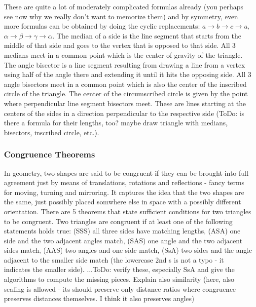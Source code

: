 These are quite a lot of moderately complicated formulas already (you perhaps see now why we really don't want to memorize them) and by symmetry, even more formulas can be obtained by doing the cyclic replacements: $a \rightarrow b \rightarrow c \rightarrow a$, $\alpha \rightarrow \beta \rightarrow \gamma \rightarrow \alpha$. The median of a side is the line segment that starts from the middle of that side and goes to the vertex that is opposed to that side. All 3 medians meet in a common point which is the center of gravity of the triangle. The angle bisector is a line segment resulting from drawing a line from a vertex using half of the angle there and extending it until it hits the opposing side. All 3 angle bisectors meet in a common point which is also the center of the inscribed circle of the triangle. The center of the circumscribed circle is given by the point where perpendicular line segment bisectors meet. These are lines starting at the centers of the sides in a direction perpendicular to the respective side (ToDo: is there a formula for their lengths, too? maybe draw triangle with medians, bisectors, inscribed circle, etc.).


\subsubsection{Congruence Theorems}
In geometry, two shapes are said to be congruent if they can be brought into full agreement just by means of translations, rotations and reflections - fancy terms for moving, turning and mirroring. It captures the idea that the two shapes are the same, just possibly placed somwhere else in space with a possibly different orientation. There are 5 theorems that state sufficient conditions for two triangles to be congruent. Two triangles are congruent if at least one of the following statements holds true: (SSS) all three sides have matching lengths, (ASA) one side and the two adjacent angles match, (SAS) one angle and the two adjacent sides match, (AAS) two angles and one side match, (SsA) two sides and the angle adjacent to the smaller side match (the lowercase 2nd s is not a typo - it indicates the smaller side). ...ToDo: verify these, especially SsA and give the algorithms to compute the missing pieces. Explain also similarity (here, also scaling is allowed - its should preserve only distance ratios where congruence preserves distances themselves. I think it also preserves angles)

